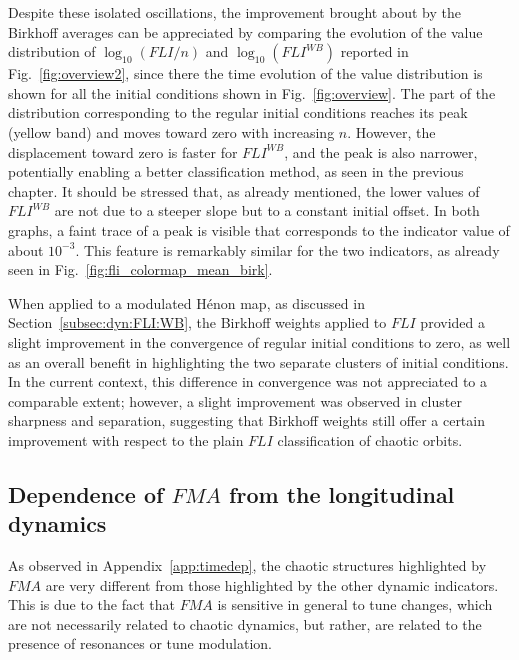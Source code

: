 Despite these isolated oscillations, the improvement brought about by the Birkhoff averages can be appreciated by comparing the evolution of the value distribution of $\log_{10}(FLI/n)$ and $\log_{10}(FLI^{WB})$ reported in Fig.~\ref{fig:overview2}, since there the time evolution of the value distribution is shown for all the initial conditions shown in Fig.~\ref{fig:overview}. The part of the distribution corresponding to the regular initial conditions reaches its peak (yellow band) and moves toward zero with increasing $n$. However, the displacement toward zero is faster for $FLI^{WB}$, and the peak is also narrower, potentially enabling a better classification method, as seen in the previous chapter. It should be stressed that, as already mentioned, the lower values of $FLI^{WB}$ are not due to a steeper slope but to a constant initial offset. In both graphs, a faint trace of a peak is visible that corresponds to the indicator value of about $10^{-3}$. This feature is remarkably similar for the two indicators, as already seen in Fig.~\ref{fig:fli_colormap_mean_birk}.

When applied to a modulated Hénon map, as discussed in Section~\ref{subsec:dyn:FLI:WB}, the Birkhoff weights applied to $FLI$ provided a slight improvement in the convergence of regular initial conditions to zero, as well as an overall benefit in highlighting the two separate clusters of initial conditions. In the current context, this difference in convergence was not appreciated to a comparable extent; however, a slight improvement was observed in cluster sharpness and separation, suggesting that Birkhoff weights still offer a certain improvement with respect to the plain $FLI$ classification of chaotic orbits. 

\subsection{Dependence of $FMA$ from the longitudinal dynamics}

As observed in Appendix~\ref{app:timedep}, the chaotic structures highlighted by $FMA$ are very different from those highlighted by the other dynamic indicators. This is due to the fact that $FMA$ is sensitive in general to tune changes, which are not necessarily related to chaotic dynamics, but rather, are related to the presence of resonances or tune modulation.

